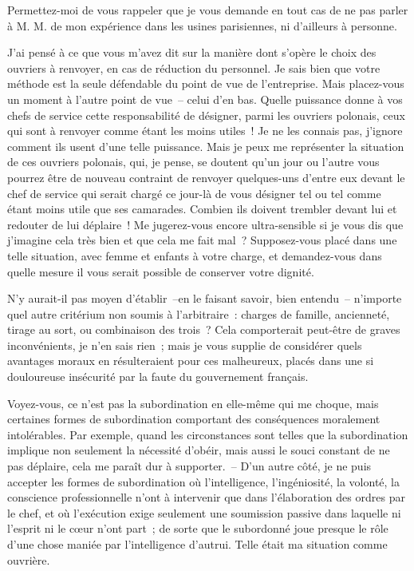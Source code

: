 \documentclass[french,twoside]{book} %
\begin{document}
Permettez-moi de vous rappeler que je vous demande en tout cas de ne pas parler à M. M. de mon expérience dans les usines parisiennes, ni d'ailleurs à personne.\par
J'ai pensé à ce que vous m'avez dit sur la manière dont s'opère le choix des ouvriers à renvoyer, en cas de réduction du personnel. Je sais bien que votre méthode est la seule défendable du point de vue de l'entreprise. Mais placez-vous un moment à l'autre point de vue – celui d'en bas. Quelle puissance donne à vos chefs de service cette responsabilité de désigner, parmi les ouvriers polonais, ceux qui sont à renvoyer comme étant les moins utiles ! Je ne les connais pas, j'ignore comment ils usent d'une telle puissance. Mais je peux me représenter la situation de ces ouvriers polonais, qui, je pense, se doutent qu'un jour ou l'autre vous pourrez être de nouveau contraint de renvoyer quelques-uns d'entre eux devant le chef de service qui serait chargé ce jour-là de vous désigner tel ou tel comme étant moins utile que ses camarades. Combien ils doivent trembler devant lui et redouter de lui déplaire ! Me jugerez-vous encore ultra-sensible si je vous dis que j'imagine cela très bien et que cela me fait mal ? Supposez-vous placé dans une telle situation, avec femme et enfants à votre charge, et demandez-vous dans quelle mesure il vous serait possible de conserver votre dignité.\par
N'y aurait-il pas moyen d'établir –en le faisant savoir, bien entendu – n'importe quel autre critérium non soumis à l'arbitraire : charges de famille, ancienneté, tirage au sort, ou combinaison des trois ? Cela comporterait peut-être de graves inconvénients, je n'en sais rien ; mais je vous supplie de considérer quels avantages moraux en résulteraient pour ces malheureux, placés dans une si douloureuse insécurité par la faute du gouvernement français.\par
Voyez-vous, ce n'est pas la subordination en elle-même qui me choque, mais certaines formes de subordination comportant des conséquences moralement intolérables. Par exemple, quand les circonstances sont telles que la subordination implique non seulement la nécessité d'obéir, mais aussi le souci constant de ne pas déplaire, cela me paraît dur à supporter. – D'un autre côté, je ne puis accepter les formes de subordination où l'intelligence, l'ingéniosité, la volonté, la conscience professionnelle n'ont à intervenir que dans l'élaboration des ordres par le chef, et où l'exécution exige seulement une soumission passive dans laquelle ni l'esprit ni le cœur n'ont part ; de sorte que le subordonné joue presque le rôle d'une chose maniée par l'intelligence d'autrui. Telle était ma situation comme ouvrière.\par
\end{document}
